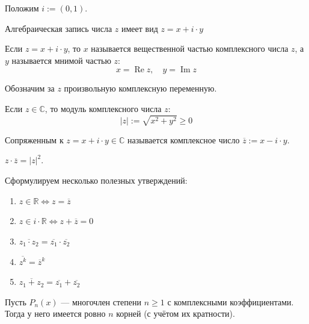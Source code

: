 \documentclass[11pt]{article}
\DeclareMathOperator{\Rere}{Re}
\DeclareMathOperator{\Imim}{Im}
\begin{document}
\begin{definition}
  Положим $i := (0, 1)$.
\end{definition}

\begin{definition}
  Алгебраическая запись числа $z$ имеет вид $z = x + i \cdot y$ 
\end{definition}

\begin{definition}
  Если $z = x + i \cdot y$, то $x$ называется вещественной частью комплексного числа $z$, а $y$ называется мнимой частью $z$: \[x = \Rere z, \quad y = \Imim z\]
\end{definition}

\begin{remark}
  Обозначим за $z$ произвольную комплексную переменную.
\end{remark}

\begin{definition}
  Если $z \in \mathbb{C}$, то модуль комплексного числа $z$: \[|z| := \sqrt{x^2 + y^2} \geq 0\]
\end{definition}

\begin{definition}
  Сопряженным к $z = x + i\cdot y \in \mathbb{C}$ называется комплексное число $\overline{z} := x - i \cdot y$.
\end{definition}

\begin{remark}
  $z \cdot \overline{z} = |z|^2$.
\end{remark}

\begin{statement}
  Сформулируем несколько полезных утверждений:
  \begin{enumerate}
    \item $z \in \mathbb{R} \Longleftrightarrow z = \overline{z}$
    \item $z \in i \cdot \mathbb{R} \Longleftrightarrow z + \overline{z} = 0$
    \item $\overline{z_1 \cdot z_2} = \overline{z_1} \cdot \overline{z_2}$
    \item $\overline{z^k} = {\overline{z}}^k$
    \item $\overline{z_1 + z_2} = \overline{z_1} + \overline{z_2}$
  \end{enumerate}
\end{statement}

\begin{theorem}
  Пусть $P_n(x)$ --- многочлен степени $n \geq 1$ с комплексными коэффициентами. Тогда у него имеется ровно $n$ корней (с учётом их кратности). 
\end{theorem}
\end{document}
